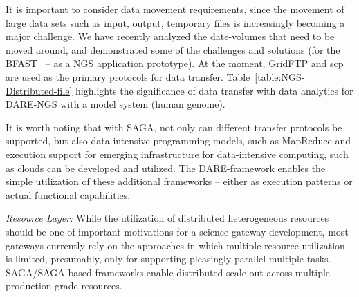 \documentclass[]{article}
\begin{document}
It is important to consider data movement requirements, since the
movement of large data sets such as input, output, temporary files is
increasingly becoming a major challenge. We have recently analyzed the
date-volumes that need to be moved around, and demonstrated some of
the challenges and solutions (for the BFAST~\cite{ecmls11} -- as a NGS
application prototype).  At the moment, GridFTP and scp are used as
the primary protocols for data
transfer. Table~\ref{table:NGS-Distributed-file} highlights the
significance of data transfer with data analytics for DARE-NGS with a
model system (human genome).

It is worth noting that with SAGA, not only can different transfer
protocols be supported, but also data-intensive programming models,
such as MapReduce and execution support for emerging infrastructure
for data-intensive computing, such as clouds can be developed and
utilized\cite{abstractions-azure,saga-ccgrid10}.  The DARE-framework
enables the simple utilization of these additional frameworks --
either as execution patterns or actual functional capabilities.






\textit{Resource Layer:} While the utilization of distributed
heterogeneous resources should be one of important motivations for a
science gateway development, most gateways currently rely on the
approaches in which multiple resource utilization is limited,
presumably, only for supporting pleasingly-parallel multiple tasks.
SAGA/SAGA-based frameworks enable distributed scale-out across
multiple production grade resources.
\end{document}
